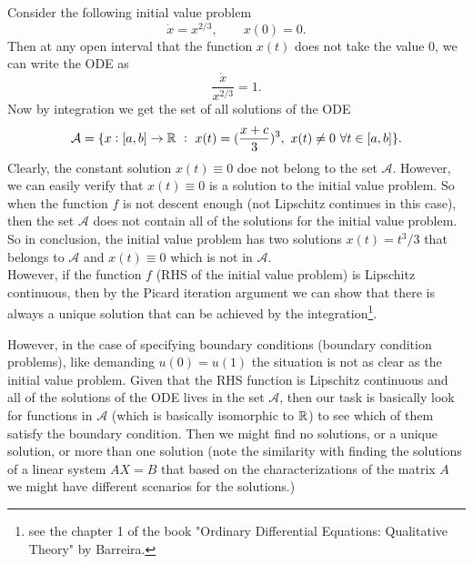 \begin{beCareful}
	Consider the following initial value problem
	\[ \dot{x} = x^{2/3}, \qquad x(0) = 0. \]
	Then at any open interval that the function $x(t)$ does not take the value 0, we can write the ODE as
	\[ \frac{\dot{x}}{x^{2/3}} = 1.  \]
	Now by integration we get the set of all solutions of the ODE 
	\[ \mathcal{A} = \set{x:[a,b]\to \R\ :\ x(t)=(\frac{x+c}{3})^3,\ x(t)\neq 0\ \forall t\in [a,b]}. \]
	Clearly, the constant solution $x(t)\equiv 0$ doe not belong to the set $\mathcal{A}$. However, we can easily verify that $x(t)\equiv 0$ is a solution to the initial value problem. So when the function $f$ is not descent enough (not Lipschitz continues in this case), then the set $\mathcal{A}$ does not contain all of the solutions for the initial value problem. So in conclusion, the initial value problem has two solutions $x(t) = t^3/3$ that belongs to $\mathcal{A}$ and $x(t) \equiv 0$ which is not in $\mathcal{A}$.\\
	However, if the function  $f$ (RHS of the initial value problem) is Lipschitz continuous, then by the Picard iteration argument we can show that there is always a unique solution that can be achieved by the integration\footnote{see the chapter 1 of the book "Ordinary Differential Equations: Qualitative Theory" by Barreira.}. 
\end{beCareful}

However, in the case of specifying boundary conditions (boundary condition problems), like demanding $u(0)=u(1)$ the situation is not as clear as the initial value problem. Given that the RHS function is Lipschitz continuous and all of the solutions of the ODE lives in the set $\mathcal{A}$, then our task is basically look for functions in $\mathcal{A}$ (which is basically isomorphic to $\mathbb{R}$) to see which of them satisfy the boundary condition. Then we might find no solutions, or a unique solution, or more than one solution (note the similarity with finding the solutions of a linear system $AX=B$ that based on the characterizations of the matrix $A$ we might have different scenarios for the solutions.)

